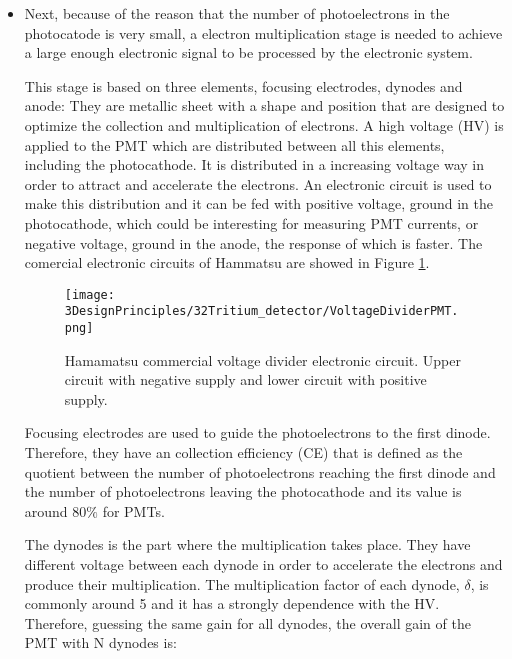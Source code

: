 \begin{itemize}
\item{} Next, because of the reason that the number of photoelectrons in the photocatode is very small, a electron multiplication stage is needed to achieve a large enough electronic signal to be processed by the electronic system. 

This stage is based on three elements, focusing electrodes, dynodes and anode: They are metallic sheet with a shape and position that are designed to optimize the collection and multiplication of electrons. A high voltage (HV) is applied to the PMT which are distributed between all this elements, including the photocathode. It is distributed in a increasing voltage way in order to attract and accelerate the electrons. An electronic circuit is used to make this distribution and it can be fed with positive voltage, ground in the photocathode, which could be interesting for measuring PMT currents, or negative voltage, ground in the anode, the response of which is faster. The comercial electronic circuits of Hammatsu are showed in Figure \ref{fig:VoltageDividerCircuit}.

\begin{figure}[h]
\centering
\texttt{[image: 3DesignPrinciples/32Tritium\_detector/VoltageDividerPMT.png]}
\caption{Hamamatsu commercial voltage divider electronic circuit. Upper circuit with negative supply and lower circuit with positive supply.\label{fig:VoltageDividerCircuit}~\cite{DataSheetPMTs}}
\end{figure}


Focusing electrodes are used to guide the photoelectrons to the first dinode. Therefore, they have an collection efficiency (CE) that is defined as the quotient between the number of photoelectrons reaching the first dinode and the number of photoelectrons leaving the photocathode and its value is around $80\%$ for PMTs.

The dynodes is the part where the multiplication takes place. They have different voltage between each dynode in order to accelerate the electrons and produce their multiplication. The multiplication factor of each dynode, $\delta$, is commonly around 5 and it has a strongly dependence with the HV. Therefore, guessing the same gain for all dynodes, the overall gain of the PMT with N dynodes is:


\end{itemize}
